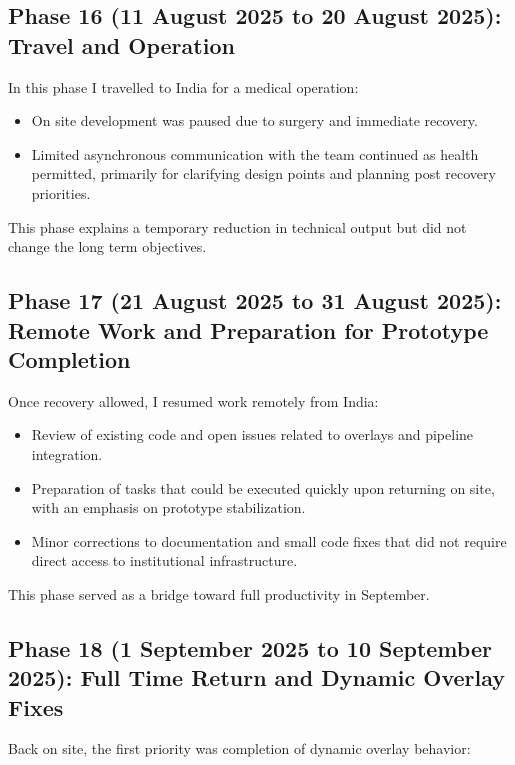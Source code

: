 \documentclass[11pt,a4paper]{article}
\begin{document}
\subsection*{Phase 16 (11 August 2025 to 20 August 2025): Travel and Operation}

In this phase I travelled to India for a medical operation:

\begin{itemize}
    \item On site development was paused due to surgery and immediate recovery.
    \item Limited asynchronous communication with the team continued as health permitted, primarily for clarifying design points and planning post recovery priorities.
\end{itemize}

This phase explains a temporary reduction in technical output but did not change the long term objectives.

\subsection*{Phase 17 (21 August 2025 to 31 August 2025): Remote Work and Preparation for Prototype Completion}

Once recovery allowed, I resumed work remotely from India:

\begin{itemize}
    \item Review of existing code and open issues related to overlays and pipeline integration.
    \item Preparation of tasks that could be executed quickly upon returning on site, with an emphasis on prototype stabilization.
    \item Minor corrections to documentation and small code fixes that did not require direct access to institutional infrastructure.
\end{itemize}

This phase served as a bridge toward full productivity in September.

\subsection*{Phase 18 (1 September 2025 to 10 September 2025): Full Time Return and Dynamic Overlay Fixes}

Back on site, the first priority was completion of dynamic overlay behavior:
\end{document}
